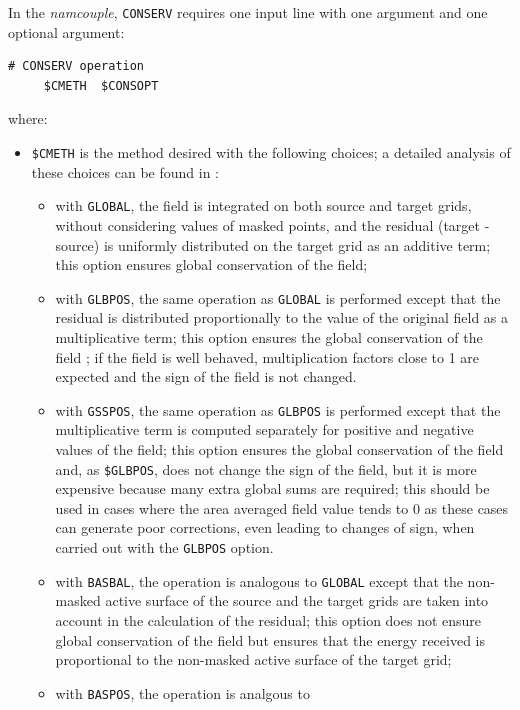 \begin{itemize}
  In the {\it namcouple}, {\tt CONSERV} requires one input line with one argument and one optional argument:

 \begin{verbatim}
# CONSERV operation
     $CMETH  $CONSOPT
\end{verbatim}
 where:
  \begin{itemize}
  \item {\tt \$CMETH} is the method desired with the following choices; a detailed analysis of these choices can be found in \cite{craig19} :
    \begin{itemize}
    \item with {\tt  GLOBAL}, the field is integrated on both
      source and target grids, without considering values of masked
      points, and the residual (target - source) is uniformly
      distributed on the target grid as an additive term; this option ensures global
      conservation of the field;
    \item with {\tt  GLBPOS}, the same operation as {\tt GLOBAL} is performed
      except that the residual is distributed proportionally to the
      value of the original field as a multiplicative term; this option ensures the 
      global conservation of the field ;  if the field is well behaved, multiplication
      factors close to 1 are expected and the sign of the field is not changed.
    \item with {\tt  GSSPOS}, the same operation as {\tt GLBPOS} is performed
      except that the multiplicative term is computed separately for positive
      and negative values of the field; this option ensures the 
      global conservation of the field and, as {\tt \$GLBPOS}, does not change the sign of the
      field, but it is more expensive because many extra global sums are required; 
      this should be used in cases where the area averaged field value tends to 0
      as these cases can generate poor corrections, even leading
      to changes of sign, when carried out with the {\tt GLBPOS} option.
    \item with {\tt  BASBAL}, the operation is analogous to
      {\tt GLOBAL} except that the non-masked active surface of the source
      and the target grids are taken into account in the calculation
      of the residual; this option does not ensure global conservation
      of the field but ensures that the energy received is
      proportional to the non-masked active surface of the target grid;
    \item with {\tt  BASPOS}, the operation is analgous to

\end{itemize}
\end{itemize}
\end{itemize}

